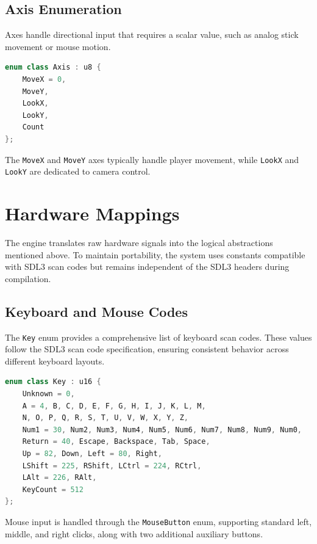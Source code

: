 \subsection{Axis Enumeration}

Axes handle directional input that requires a scalar value, such as analog stick movement or mouse motion.

\begin{lstlisting}[language=C++]
enum class Axis : u8 {
    MoveX = 0,
    MoveY,
    LookX,
    LookY,
    Count
};
\end{lstlisting}

The \texttt{MoveX} and \texttt{MoveY} axes typically handle player movement, while \texttt{LookX} and \texttt{LookY} are dedicated to camera control.

\section{Hardware Mappings}

The engine translates raw hardware signals into the logical abstractions mentioned above. To maintain portability, the system uses constants compatible with SDL3 scan codes but remains independent of the SDL3 headers during compilation.

\subsection{Keyboard and Mouse Codes}

The \texttt{Key} enum provides a comprehensive list of keyboard scan codes. These values follow the SDL3 scan code specification, ensuring consistent behavior across different keyboard layouts.

\begin{lstlisting}[language=C++]
enum class Key : u16 {
    Unknown = 0,
    A = 4, B, C, D, E, F, G, H, I, J, K, L, M,
    N, O, P, Q, R, S, T, U, V, W, X, Y, Z,
    Num1 = 30, Num2, Num3, Num4, Num5, Num6, Num7, Num8, Num9, Num0,
    Return = 40, Escape, Backspace, Tab, Space,
    Up = 82, Down, Left = 80, Right,
    LShift = 225, RShift, LCtrl = 224, RCtrl,
    LAlt = 226, RAlt,
    KeyCount = 512
};
\end{lstlisting}

Mouse input is handled through the \texttt{MouseButton} enum, supporting standard left, middle, and right clicks, along with two additional auxiliary buttons.

